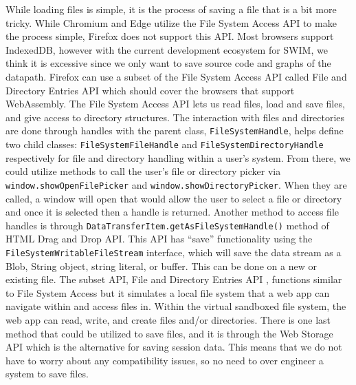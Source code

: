 \documentclass[
    paper=letter,
    parskip=half,
    fontsize=12pt,
    titlepage=firstiscover,
    toc=bibliography,
    numbers=endperiod
]{scrartcl}
\begin{document}
While loading files is simple, it is the process of saving a file that
is a bit more tricky. While Chromium and Edge utilize the File System
Access API to make the process simple, Firefox does not support this
API. Most browsers support IndexedDB, however with the current
development ecosystem for SWIM, we think it is excessive since we only
want to save source code and graphs of the datapath. Firefox can use a
subset of the File System Access API called File and Directory Entries
API which should cover the browsers that support WebAssembly. The File
System Access API lets us read files, load and save files, and give
access to directory structures. The interaction with files and
directories are done through handles with the parent class,
\texttt{FileSystemHandle}, helps define two child classes:
\texttt{FileSystemFileHandle} and \texttt{FileSystemDirectoryHandle}
respectively for file and directory handling within a user's system.
From there, we could utilize methods to call the user's file or
directory picker via \texttt{window.showOpenFilePicker} and
\texttt{window.showDirectoryPicker}. When they are called, a window will
open that would allow the user to select a file or directory and once it
is selected then a handle is returned. Another method to access file
handles is through \texttt{DataTransferItem.getAsFileSystemHandle()}
method of HTML Drag and Drop API. This API has ``save'' functionality
using the \texttt{FileSystemWritableFileStream} interface, which will
save the data stream as a Blob, String object, string literal, or
buffer. This can be done on a new or existing file. The subset API, File
and Directory Entries API \cite{mdn-file-and-directory-entries-api},
functions similar to File System Access but it simulates a local file
system that a web app can navigate within and access files in. Within
the virtual sandboxed file system, the web app can read, write, and
create files and/or directories. There is one last method that could be
utilized to save files, and it is through the Web Storage API which is
the alternative for saving session data. This means that we do not have
to worry about any compatibility issues, so no need to over engineer a
system to save files.
\end{document}
